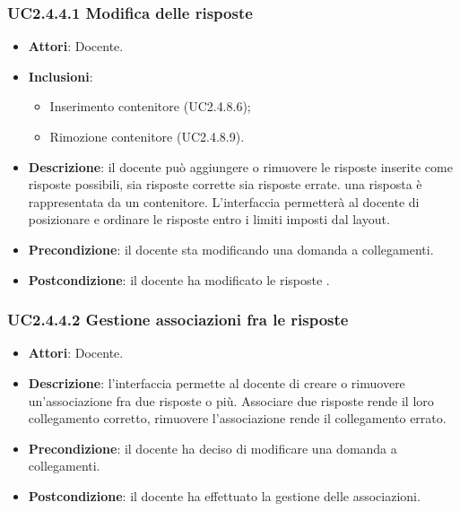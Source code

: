\subsubsection{UC2.4.4.1 Modifica delle risposte}
\begin{itemize}
\item \textbf{Attori}: Docente.
\item \textbf{Inclusioni}:
\begin{itemize}
\item Inserimento contenitore (UC2.4.8.6);
\item Rimozione contenitore (UC2.4.8.9).
\end{itemize}
\item \textbf{Descrizione}: il docente può aggiungere o rimuovere le risposte inserite come risposte possibili, sia risposte corrette sia risposte errate. una risposta è rappresentata da un contenitore. L'interfaccia permetterà al docente di posizionare e ordinare le risposte entro i limiti imposti dal layout.
\item \textbf{Precondizione}: il docente sta modificando una domanda a collegamenti.
\item \textbf{Postcondizione}: il docente ha modificato le risposte .
\end{itemize}
\subsubsection{UC2.4.4.2 Gestione associazioni fra le risposte }
\begin{itemize}
\item \textbf{Attori}: Docente.
\item \textbf{Descrizione}: l'interfaccia permette al docente di creare o rimuovere un'associazione fra due risposte o più. Associare due risposte rende il loro collegamento corretto, rimuovere l'associazione rende il collegamento errato.
\item \textbf{Precondizione}: il docente ha deciso di modificare una domanda a collegamenti.
\item \textbf{Postcondizione}: il docente ha effettuato la gestione delle associazioni.
\end{itemize}
